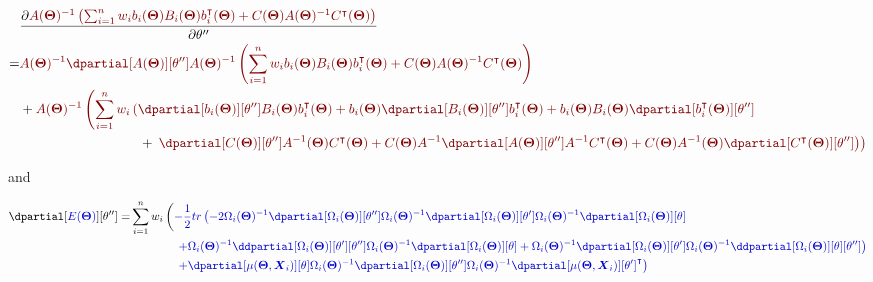 \documentclass[12pt]{article}
\newcommand{\darkblue}{blue!80!black}
\newcommand{\darkred}{red!50!black}
\newcommand\trans[1]{{#1}^\intercal}%
\newcommand{\param}{\Theta}
\newcommand{\Vparam}{\boldsymbol{\param}}
\newcommand{\VX}{\boldsymbol{X}}
\begin{document}
\begin{align*}
 & \frac{\partial \textcolor{\darkred}{ A(\Vparam)^{-1} \left(\sum_{i=1}^n w_i b_i(\Vparam) B_i(\Vparam) \trans{b}_i(\Vparam) + C(\Vparam)A(\Vparam)^{-1} \trans{C}(\Vparam) \right)}}{\partial \theta^{\prime\prime}} \\
 =& \textcolor{\darkred}{A(\Vparam)^{-1} \dpartial[A(\Vparam)][\theta^{\prime\prime}] A(\Vparam)^{-1} \left(\sum_{i=1}^n w_i b_i(\Vparam) B_i(\Vparam) \trans{b}_i(\Vparam) + C(\Vparam)A(\Vparam)^{-1} \trans{C}(\Vparam) \right)} \\
 & +\textcolor{\darkred}{A(\Vparam)^{-1} \left(\sum_{i=1}^n w_i \left(
 \dpartial[b_i(\Vparam)][\theta^{\prime\prime}]  B_i(\Vparam) \trans{b}_i(\Vparam)
 + b_i(\Vparam) \dpartial[B_i(\Vparam)][\theta^{\prime\prime}]   \trans{b}_i(\Vparam)
 + b_i(\Vparam) B_i(\Vparam) \dpartial[\trans{b}_i(\Vparam)][\theta^{\prime\prime}] \right. \right. } \\
& \qquad \qquad \qquad \qquad \quad + \textcolor{\darkred}{\left. \left.
 \dpartial[C(\Vparam)][\theta^{\prime\prime}]  A^{-1}(\Vparam) \trans{C}(\Vparam)
 + C(\Vparam) A^{-1}\dpartial[A(\Vparam)][\theta^{\prime\prime}]A^{-1}   \trans{C}(\Vparam)
 + C(\Vparam) A^{-1}(\Vparam) \dpartial[\trans{C}(\Vparam)][\theta^{\prime\prime}]
\right) \right)}
\end{align*}

and

\begin{align*}
 \dpartial[\textcolor{\darkblue}{E(\Vparam)}][\theta^{\prime\prime}]=&
 \sum_{i=1}^n w_i \left( \textcolor{\darkblue}{
- \frac{1}{2} tr\left(
-2\Omega_i(\Vparam)^{-1} \dpartial[\Omega_i(\Vparam)][\theta^{\prime\prime}] \Omega_i(\Vparam)^{-1} \dpartial[\Omega_i(\Vparam)][\theta^{\prime}] \Omega_i(\Vparam)^{-1} \dpartial[\Omega_i(\Vparam)][\theta] \right. } \right. \\
& \qquad \qquad \textcolor{\darkblue}{\left. + \Omega_i(\Vparam)^{-1} \ddpartial[\Omega_i(\Vparam)][\theta^{\prime}][\theta^{\prime\prime}] \Omega_i(\Vparam)^{-1} \dpartial[\Omega_i(\Vparam)][\theta]
+ \Omega_i(\Vparam)^{-1} \dpartial[\Omega_i(\Vparam)][\theta^{\prime}] \Omega_i(\Vparam)^{-1} \ddpartial[\Omega_i(\Vparam)][\theta][\theta^{\prime\prime}]
\right)} \\
& \qquad \qquad  \textcolor{\darkblue}{\left. + \dpartial[\mu(\Vparam,\VX_i)][\theta] \Omega_i(\Vparam)^{-1} \dpartial[\Omega_i(\Vparam)][\theta^{\prime\prime}] \Omega_i(\Vparam)^{-1}   \trans{\dpartial[\mu(\Vparam,\VX_i)][\theta^{\prime}]}
 \right)}
\end{align*}
\end{document}
